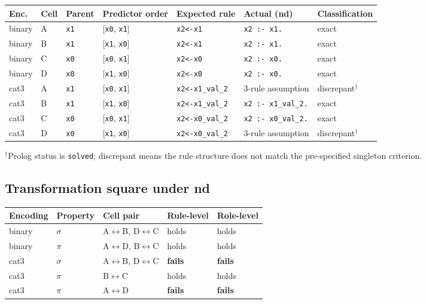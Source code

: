 \documentclass[11pt,a4paper]{article}
\begin{document}
\begin{center}
\footnotesize
\setlength{\tabcolsep}{3pt}
\begin{tabularx}{\linewidth}{@{}lllYYYY@{}}
\toprule
Enc. & Cell & Parent & Predictor order & Expected rule & Actual (nd) & Classification \\
\midrule
binary & A & \texttt{x1} & [\texttt{x0}, \texttt{x1}] & \texttt{x2<-x1} & \texttt{x2 :- x1.} & exact \\
binary & B & \texttt{x1} & [\texttt{x1}, \texttt{x0}] & \texttt{x2<-x1} & \texttt{x2 :- x1.} & exact \\
binary & C & \texttt{x0} & [\texttt{x0}, \texttt{x1}] & \texttt{x2<-x0} & \texttt{x2 :- x0.} & exact \\
binary & D & \texttt{x0} & [\texttt{x1}, \texttt{x0}] & \texttt{x2<-x0} & \texttt{x2 :- x0.} & exact \\
cat3 & A & \texttt{x1} & [\texttt{x0}, \texttt{x1}] & \texttt{x2<-x1\_val\_2} & 3-rule assumption & discrepant$^\dagger$ \\
cat3 & B & \texttt{x1} & [\texttt{x1}, \texttt{x0}] & \texttt{x2<-x1\_val\_2} & \texttt{x2 :- x1\_val\_2.} & exact \\
cat3 & C & \texttt{x0} & [\texttt{x0}, \texttt{x1}] & \texttt{x2<-x0\_val\_2} & \texttt{x2 :- x0\_val\_2.} & exact \\
cat3 & D & \texttt{x0} & [\texttt{x1}, \texttt{x0}] & \texttt{x2<-x0\_val\_2} & 3-rule assumption & discrepant$^\dagger$ \\
\bottomrule
\end{tabularx}
\end{center}

{\footnotesize $^\dagger$Prolog status is \texttt{solved}; discrepant means the rule structure
does not match the pre-specified singleton criterion.}

\subsection{Transformation square under nd}

\begin{center}
\small
\setlength{\tabcolsep}{4pt}
\begin{tabularx}{\linewidth}{@{}llYll@{}}
\toprule
Encoding & Property & Cell pair & Rule-level & Role-level \\
\midrule
binary & $\sigma$ & A$\leftrightarrow$B, D$\leftrightarrow$C & holds & holds \\
binary & $\pi$ & A$\leftrightarrow$D, B$\leftrightarrow$C & holds & holds \\
cat3 & $\sigma$ & A$\leftrightarrow$B, D$\leftrightarrow$C & \textbf{fails} & \textbf{fails} \\
cat3 & $\pi$ & B$\leftrightarrow$C & holds & holds \\
cat3 & $\pi$ & A$\leftrightarrow$D & \textbf{fails} & \textbf{fails} \\
\bottomrule
\end{tabularx}
\end{center}
\end{document}
